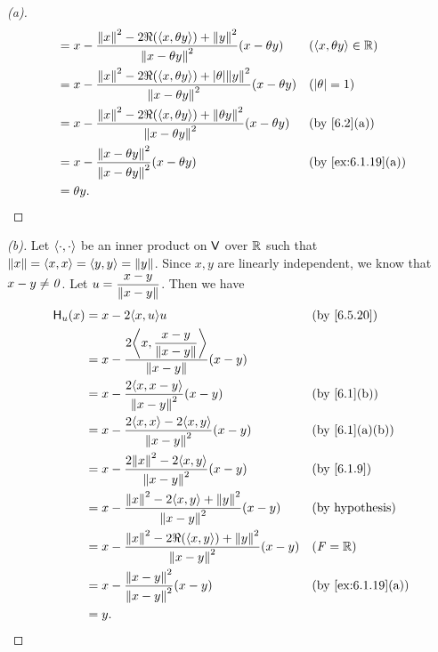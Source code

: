 \begin{proof}[(a)]
\begin{align*}
                & = x - \dfrac{\norm{x}^2 - 2 \Re(\inn{x, \theta y}) + \norm{y}^2}{\norm{x - \theta y}^2} (x - \theta y)              &  & (\inn{x, \theta y} \in \R) \\
                & = x - \dfrac{\norm{x}^2 - 2 \Re(\inn{x, \theta y}) + \abs{\theta} \norm{y}^2}{\norm{x - \theta y}^2} (x - \theta y) &  & (\abs{\theta} = 1)         \\
                & = x - \dfrac{\norm{x}^2 - 2 \Re(\inn{x, \theta y}) + \norm{\theta y}^2}{\norm{x - \theta y}^2} (x - \theta y)       &  & \by{6.2}[a]                \\
                & = x - \dfrac{\norm{x - \theta y}^2}{\norm{x - \theta y}^2} (x - \theta y)                                           &  & \by{ex:6.1.19}[a]          \\
                & = \theta y.
  \end{align*}
\end{proof}

\begin{proof}[(b)]
  Let \(\left\langle\cdot, \cdot\right\rangle\) be an inner product on \(\mathsf{V}\) over \(\mathbb{R}\) such that \(\left\lVert x\right\rVert = \left\langle x, x\right\rangle = \left\langle y, y\right\rangle = \left\lVert y\right\rVert\).
  Since \(x, y\) are linearly independent, we know that \(x - y \neq \mathit{0}\).
  Let \(u = \dfrac{x - y}{\left\lVert x- y\right\rVert}\).
  Then we have
  \begin{align*}
    \lt{H}_u(x) & = x - 2 \inn{x, u} u                                                              &  & \by{6.5.20}            \\
                & = x - \dfrac{2 \inn{x, \dfrac{x - y}{\norm{x - y}}}}{\norm{x - y}} (x - y)                                    \\
                & = x - \dfrac{2 \inn{x, x - y}}{\norm{x - y}^2} (x - y)                            &  & \by{6.1}[b]            \\
                & = x - \dfrac{2 \inn{x, x} - 2 \inn{x, y}}{\norm{x - y}^2} (x - y)                 &  & \by{6.1}[a,b]          \\
                & = x - \dfrac{2 \norm{x}^2 - 2 \inn{x, y}}{\norm{x - y}^2} (x - y)                 &  & \by{6.1.9}             \\
                & = x - \dfrac{\norm{x}^2 - 2 \inn{x, y} + \norm{y}^2}{\norm{x - y}^2} (x - y)      &  & \text{(by hypothesis)} \\
                & = x - \dfrac{\norm{x}^2 - 2 \Re(\inn{x, y}) + \norm{y}^2}{\norm{x - y}^2} (x - y) &  & (\F = \R)              \\
                & = x - \dfrac{\norm{x - y}^2}{\norm{x - y}^2} (x - y)                              &  & \by{ex:6.1.19}[a]      \\
                & = y.
  \end{align*}
\end{proof}
